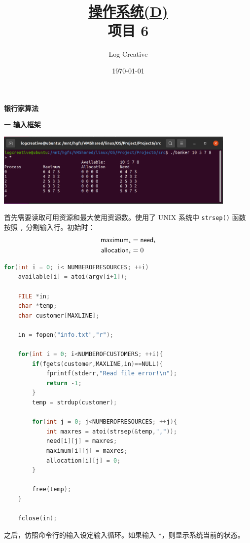 \documentclass[12pt,a4paper]{article}
\newenvironment{problems}{\begin{list}{}{\renewcommand{\makelabel}[1]{\textbf{##1}\hfil}}}{\end{list}}
\begin{document}
\title{\normalsize \underline{操作系统(D)}\\\LARGE 项目 6}
\author{Log Creative }
\date{\today}
\maketitle

\textbf{银行家算法}
\begin{problems}
    \item[一] \textbf{输入框架}
    
    \includegraphics[width=0.88\textwidth]{input.png}

    首先需要读取可用资源和最大使用资源数。使用了 UNIX 系统中 \verb"strsep()" 函数按照 \verb"," 分割输入行。初始时：
    \begin{align*}
        \text{\sffamily maximum}_i &= \text{\sffamily need}_i \\
        \text{\sffamily allocation}_i &=0
    \end{align*}
    \begin{lstlisting}[language=c]
    for(int i = 0; i< NUMBEROFRESOURCES; ++i)
    available[i] = atoi(argv[i+1]);
    
    FILE *in;
    char *temp;
    char customer[MAXLINE];

    in = fopen("info.txt","r");

    for(int i = 0; i<NUMBEROFCUSTOMERS; ++i){
        if(fgets(customer,MAXLINE,in)==NULL){
            fprintf(stderr,"Read file error!\n");
            return -1;
        }
        temp = strdup(customer);

        for(int j = 0; j<NUMBEROFRESOURCES; ++j){
            int maxres = atoi(strsep(&temp,","));
            need[i][j] = maxres;
            maximum[i][j] = maxres;
            allocation[i][j] = 0;
        }
        
        free(temp);
    }

    fclose(in);
    \end{lstlisting}

    之后，仿照命令行的输入设定输入循环。如果输入 \verb"*"，则显示系统当前的状态。


\end{problems}
\end{document}
